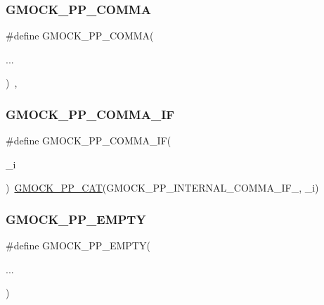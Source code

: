 \mbox{\label{googletest-master_2googlemock_2include_2gmock_2internal_2gmock-pp_8h_a44870968c9989ec20c90812361e21a55}} 
\subsubsection{\texorpdfstring{GMOCK\_PP\_COMMA}{GMOCK\_PP\_COMMA}}
{\footnotesize\ttfamily \#define G\+M\+O\+C\+K\+\_\+\+P\+P\+\_\+\+C\+O\+M\+MA(\begin{DoxyParamCaption}\item[{}]{... }\end{DoxyParamCaption})~,}

\mbox{\label{googletest-master_2googlemock_2include_2gmock_2internal_2gmock-pp_8h_acad3f789b483c40204f25a56c3342103}} 
\subsubsection{\texorpdfstring{GMOCK\_PP\_COMMA\_IF}{GMOCK\_PP\_COMMA\_IF}}
{\footnotesize\ttfamily \#define G\+M\+O\+C\+K\+\_\+\+P\+P\+\_\+\+C\+O\+M\+M\+A\+\_\+\+IF(\begin{DoxyParamCaption}\item[{}]{\+\_\+i }\end{DoxyParamCaption})~\mbox{\hyperlink{_obj__test_2lib_2googletest-master_2googlemock_2include_2gmock_2internal_2gmock-pp_8h_a108c52ffa81ab99348d23b8fa76fded3}{G\+M\+O\+C\+K\+\_\+\+P\+P\+\_\+\+C\+AT}}(G\+M\+O\+C\+K\+\_\+\+P\+P\+\_\+\+I\+N\+T\+E\+R\+N\+A\+L\+\_\+\+C\+O\+M\+M\+A\+\_\+\+I\+F\+\_\+, \+\_\+i)}

\mbox{\label{googletest-master_2googlemock_2include_2gmock_2internal_2gmock-pp_8h_a7dc39000427944f011a62b2aa915fc2a}} 
\subsubsection{\texorpdfstring{GMOCK\_PP\_EMPTY}{GMOCK\_PP\_EMPTY}}
{\footnotesize\ttfamily \#define G\+M\+O\+C\+K\+\_\+\+P\+P\+\_\+\+E\+M\+P\+TY(\begin{DoxyParamCaption}\item[{}]{... }\end{DoxyParamCaption})}


